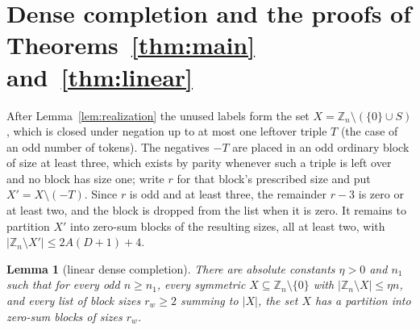 \documentclass[11pt,a4paper]{article}
\theoremstyle{plain}
\newtheorem{lemma}[theorem]{Lemma}
\theoremstyle{definition}
\theoremstyle{remark}
\newcommand{\Z}{\mathbb{Z}}
\begin{document}
\section{Dense completion and the proofs of Theorems~\ref{thm:main} and~\ref{thm:linear}}\label{sec:dense}

After Lemma~\ref{lem:realization} the unused labels form the set
$X=\Z_n\setminus(\{0\}\cup S)$, which is closed under negation up to at most
one leftover triple $T$ (the case of an odd number of tokens).  The negatives
$-T$ are placed in an odd ordinary block of size at least three, which exists
by parity whenever such a triple is left over and no block has size one; write
$r$ for that block's prescribed size and put
$X'=X\setminus(-T)$.  Since $r$ is odd and at least three, the remainder $r-3$
is zero or at least two, and the block is dropped from the list when it is
zero.  It remains to partition $X'$ into zero-sum blocks of the resulting
sizes, all at least two, with $|\Z_n\setminus X'|\le 2A(D+1)+4$.

\begin{lemma}[linear dense completion]\label{lem:dense}
There are absolute constants $\eta>0$ and $n_1$ such that for every odd
$n\ge n_1$, every symmetric $X\subseteq\Z_n\setminus\{0\}$ with
$|\Z_n\setminus X|\le\eta n$, and every list of block sizes $r_w\ge 2$ summing
to $|X|$, the set $X$ has a partition into zero-sum blocks of sizes $r_w$.
\end{lemma}
\end{document}
